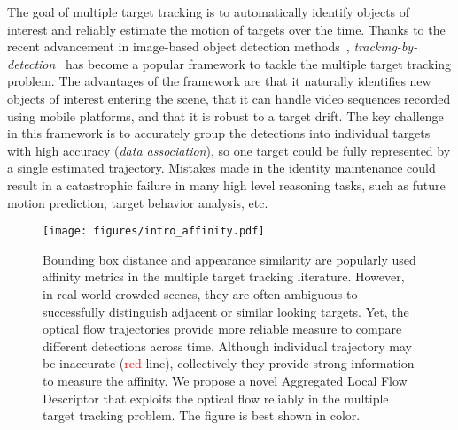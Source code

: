 \documentclass[10pt,twocolumn,letterpaper]{article}
\begin{document}
The goal of multiple target tracking is to automatically identify objects of interest and reliably estimate the motion of targets over the time. 
Thanks to the recent advancement in 
image-based object detection methods~\cite{DollarPAMI14pyramids,felzenszwalb2010object,girshick2013rich,wang2013regionlets}, \emph{tracking-by-detection}~\cite{BerclazFTF11,BreitensteinICCV09,Ess_PAMI_09,Kuo_CVPR_10,Milan:2014:CEM} has become a popular framework to tackle the multiple target tracking problem. The advantages of the framework are that it naturally identifies new objects of interest entering the scene, that it can handle video sequences recorded using mobile platforms, and that it is robust to a target drift. The key challenge in this framework is to accurately group the detections into individual targets with high accuracy (\emph{data association}), so one target could be fully represented by a single estimated trajectory. Mistakes made in the identity maintenance could result in a catastrophic failure in many high level reasoning tasks, such as future motion prediction, target behavior analysis, etc. 
\begin{figure}
\begin{center}
\texttt{[image: figures/intro\_affinity.pdf]}
\end{center}
\caption{Bounding box distance and appearance similarity are popularly used affinity metrics in the multiple target tracking literature. However, in real-world crowded scenes, they are often ambiguous to successfully distinguish adjacent or similar looking targets. Yet, the optical flow trajectories provide more reliable measure to compare different detections across time. Although individual trajectory may be inaccurate (\textcolor{red}{red} line), collectively they provide strong information to measure the affinity. We propose a novel Aggregated Local Flow Descriptor that exploits the optical flow reliably in the multiple target tracking problem. The figure is best shown in color.}
\label{fig:intro}
\end{figure}
\end{document}
